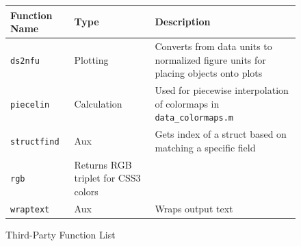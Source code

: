 \documentclass{article}
\begin{document}
\begin{figure}[h]
\caption{Third-Party Function List}
\begin{center}
\begin{tabular}{l p{1.5in} | p{3in}}
Function Name&Type&Description\\ \hline
\texttt{ds2nfu}&Plotting&Converts from data units to normalized figure units for placing objects onto plots\\
\texttt{piecelin}&Calculation&Used for piecewise interpolation of colormaps in \texttt{data\_colormaps.m}\\
\texttt{structfind}&Aux&Gets index of a struct based on matching a specific field\\
\texttt{rgb}&Returns RGB triplet for CSS3 colors\\
\texttt{wraptext}&Aux&Wraps output text\\ 
\end{tabular}
\end{center}
\end{figure}
\end{document}
